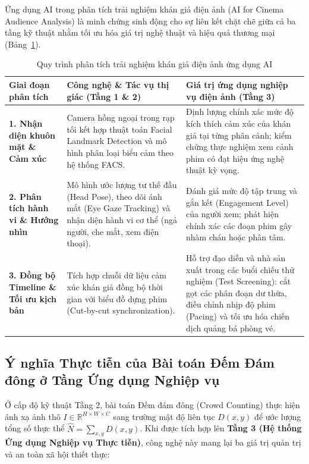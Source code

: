 Ứng dụng AI trong phân tích trải nghiệm khán giả điện ảnh (AI for Cinema Audience Analysis) là minh chứng sinh động cho sự liên kết chặt chẽ giữa cả ba tầng kỹ thuật nhằm tối ưu hóa giá trị nghệ thuật và hiệu quả thương mại (Bảng~\ref{tab:ai_cinema_pipeline}).

\begin{table}[H]
\centering
\small
\caption{Quy trình phân tích trải nghiệm khán giả điện ảnh ứng dụng AI}
\label{tab:ai_cinema_pipeline}
\renewcommand{\arraystretch}{1.3}
\begin{tabularx}{\textwidth}{|p{3.0cm}|X|X|}
\hline
\textbf{Giai đoạn phân tích} & \textbf{Công nghệ \& Tác vụ thị giác (Tầng 1 \& 2)} & \textbf{Giá trị ứng dụng nghiệp vụ điện ảnh (Tầng 3)} \\
\hline
\textbf{1. Nhận diện khuôn mặt \& Cảm xúc} & Camera hồng ngoại trong rạp tối kết hợp thuật toán Facial Landmark Detection và mô hình phân loại biểu cảm theo hệ thống FACS. & Định lượng chính xác mức độ kích thích cảm xúc của khán giả tại từng phân cảnh; kiểm chứng thực nghiệm xem cảnh phim có đạt hiệu ứng nghệ thuật kỳ vọng. \\
\hline
\textbf{2. Phân tích hành vi \& Hướng nhìn} & Mô hình ước lượng tư thế đầu (Head Pose), theo dõi ánh mắt (Eye Gaze Tracking) và nhận diện hành vi cơ thể (ngả người, che mắt, xem điện thoại). & Đánh giá mức độ tập trung và gắn kết (Engagement Level) của người xem; phát hiện chính xác các đoạn phim gây nhàm chán hoặc phân tâm. \\
\hline
\textbf{3. Đồng bộ Timeline \& Tối ưu kịch bản} & Tích hợp chuỗi dữ liệu cảm xúc khán giả đồng bộ thời gian với biểu đồ dựng phim (Cut-by-cut synchronization). & Hỗ trợ đạo diễn và nhà sản xuất trong các buổi chiếu thử nghiệm (Test Screening): cắt gọt các phân đoạn dư thừa, điều chỉnh nhịp độ phim (Pacing) và tối ưu hóa chiến dịch quảng bá phòng vé. \\
\hline
\end{tabularx}
\end{table}

\subsection{Ý nghĩa Thực tiễn của Bài toán Đếm Đám đông ở Tầng Ứng dụng Nghiệp vụ}

Ở cấp độ kỹ thuật Tầng 2, bài toán Đếm đám đông (Crowd Counting) thực hiện ánh xạ ảnh thô $I \in \mathbb{R}^{H \times W \times C}$ sang trường mật độ liên tục $D(x, y)$ để ước lượng tổng số thực thể $\hat{N} = \sum_{x,y} D(x, y)$. Khi được tích hợp lên \textbf{Tầng 3 (Hệ thống Ứng dụng Nghiệp vụ Thực tiễn)}, công nghệ này mang lại ba giá trị quản trị và an toàn xã hội thiết thực:

